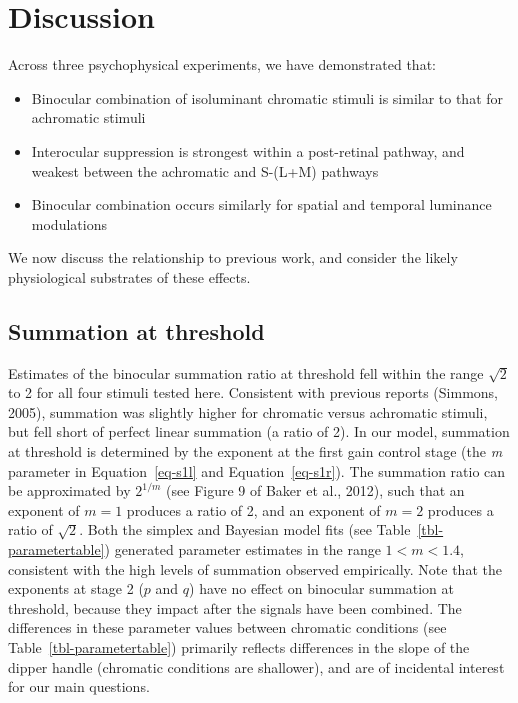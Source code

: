 \documentclass[
  letterpaper,
  DIV=11,
  numbers=noendperiod]{scrartcl}
\providecommand{\tightlist}{%
  \setlength{\itemsep}{0pt}\setlength{\parskip}{0pt}}\usepackage{longtable,booktabs,array}
\begin{document}
\section{Discussion}\label{discussion}

Across three psychophysical experiments, we have demonstrated that:

\begin{itemize}
\tightlist
\item
  Binocular combination of isoluminant chromatic stimuli is similar to
  that for achromatic stimuli
\item
  Interocular suppression is strongest within a post-retinal pathway,
  and weakest between the achromatic and S-(L+M) pathways
\item
  Binocular combination occurs similarly for spatial and temporal
  luminance modulations
\end{itemize}

We now discuss the relationship to previous work, and consider the
likely physiological substrates of these effects.

\subsection{Summation at threshold}\label{summation-at-threshold}

Estimates of the binocular summation ratio at threshold fell within the
range \(\sqrt{2}\) to 2 for all four stimuli tested here. Consistent
with previous reports (Simmons, 2005), summation was slightly higher for
chromatic versus achromatic stimuli, but fell short of perfect linear
summation (a ratio of 2). In our model, summation at threshold is
determined by the exponent at the first gain control stage (the \emph{m}
parameter in Equation~\ref{eq-s1l} and Equation~\ref{eq-s1r}). The
summation ratio can be approximated by \(2^{1/m}\) (see Figure 9 of
Baker et al., 2012), such that an exponent of \(m=1\) produces a ratio
of 2, and an exponent of \(m = 2\) produces a ratio of \(\sqrt{2}\).
Both the simplex and Bayesian model fits (see
Table~\ref{tbl-parametertable}) generated parameter estimates in the
range \(1 < m < 1.4\), consistent with the high levels of summation
observed empirically. Note that the exponents at stage 2 (\(p\) and
\(q\)) have no effect on binocular summation at threshold, because they
impact after the signals have been combined. The differences in these
parameter values between chromatic conditions (see
Table~\ref{tbl-parametertable}) primarily reflects differences in the
slope of the dipper handle (chromatic conditions are shallower), and are
of incidental interest for our main questions.
\end{document}
